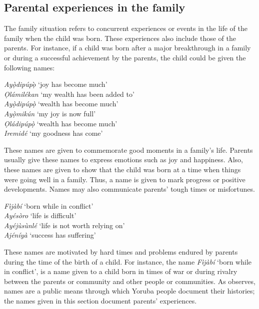 \documentclass[output=paper,colorlinks,citecolor=brown]{langscibook}
\begin{document}
\subsection{Parental experiences in the family}

The family situation refers to concurrent experiences or events in the life of the family when the child was born. These experiences also include those of the parents. For instance, if a child was born after a major breakthrough in a family or during a successful achievement by the parents, the child could be given the following names:

\ea \label{Experience1}
\begin{xlist}
\ex	\textit{Ayọ̀dipúpọ}̀  	‘joy has become much’\\
\ex	\textit{Ọlámilékan} 	‘my wealth has been added to’\\
\ex	\textit{Ayọ̀dipúpọ̀}	‘wealth has become much’\\
\ex	\textit{Ayọ̀mikún} 	‘my joy is now full’\\
\ex	\textit{Ọládipúpọ̀}	‘wealth has become much’\\
\ex	\textit{Iremidé}	‘my goodness has come’\\
\end{xlist}
\z

These names are given to commemorate good moments in a family’s life. Parents usually give these names to express emotions such as joy and happiness. Also, these names are given to show that the child was born at a time when things were going well in a family. Thus, a name is given to mark progress or positive developments. Names may also communicate parents’ tough times or misfortunes.

\ea \label{Experience2}
\begin{xlist}
\ex	\textit{Fìjàbí}		‘born while in conflict’\\
\ex	\textit{Ayésòro} 	 ‘life is difficult’\\
\ex	\textit{Ayéjùsùnlé} 	‘life is not worth relying on’\\
\ex	\textit{Ajéníyà}		‘success has suffering’\\
\end{xlist}
\z

These names are motivated by hard times and problems endured by parents during the time of the birth of a child. For instance, the name \textit{Fìjàbí} ‘born while in conflict’, is a name given to a child born in times of war or during rivalry between the parents or community and other people or communities. As \citet{Akinyemi2005} observes, names are a public means through which Yoruba people document their histories; the names given in this section document parents’ experiences.
\end{document}
